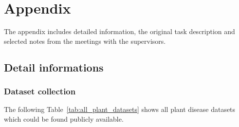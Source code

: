\appendix
\chapter{Appendix}
The appendix includes detailed information, the original task description and selected notes from the meetings with the supervisors.

\section{Detail informations}

\newpage %
\subsection{Dataset collection}\label{appendix:datasets_tables}
The following Table~\ref{tab:all_plant_datasets} shows all plant disease datasets which could be found publicly available. 

